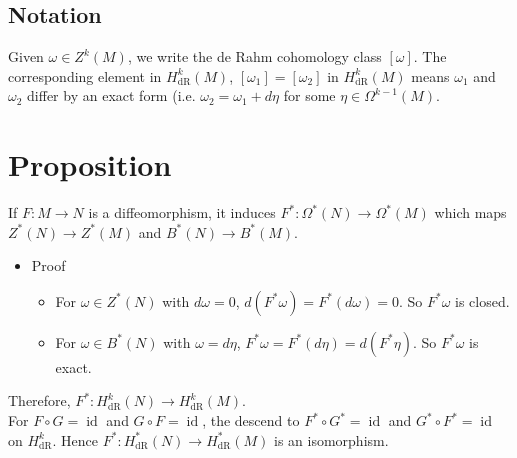 \documentclass[11pt]{article}
\begin{document}
\subsection*{Notation}
\label{sec:org1fe143d}
Given \(\omega\in Z^{k}(M)\), we write the de Rahm cohomology class \([\omega]\). The corresponding element in \(H^{k}_{\text{dR}}(M)\), \([\omega_{1}]=[\omega_{2}]\) in \(H^{k}_{\text{dR}}(M)\) means \(\omega_{1}\) and \(\omega_{2}\) differ by an exact form (i.e. \(\omega_{2}=\omega_{1}+d\eta\) for some \(\eta\in\Omega^{k-1}(M)\).\\
\section*{Proposition}
\label{sec:orgadc4314}
If \(F:M\to N\) is a diffeomorphism, it induces \(F^{*}:\Omega^{*}(N)\to\Omega^{*}(M)\) which maps \(Z^{*}(N)\to Z^{*}(M)\) and \(B^{*}(N)\to B^{*}(M)\).\\
\begin{itemize}
\item Proof\\
\begin{itemize}
\item For \(\omega\in Z^{*}(N)\) with \(d\omega=0\), \(d(F^{*}\omega)=F^{*}(d\omega)=0\). So \(F^{*}\omega\) is closed.\\
\item For \(\omega\in B^{*}(N)\) with \(\omega=d\eta\), \(F^{*}\omega=F^{*}(d\eta)=d(F^{*}\eta)\). So \(F^{*}\omega\) is exact.\\
\end{itemize}
\end{itemize}

Therefore, \(F^{*}:H^{k}_{\text{dR}}(N)\to H^{k}_{\text{dR}}(M)\).\\
For \(F\circ G=\operatorname{id}\) and \(G\circ F=\operatorname{id}\), the descend to \(F^{*}\circ G^{*}=\operatorname{id}\) and \(G^{*}\circ F^{*}=\operatorname{id}\) on \(H^{k}_{\text{dR}}\). Hence \(F^{*}:H^{*}_{\text{dR}}(N)\to H^{*}_{\text{dR}}(M)\) is an isomorphism.\\
\end{document}
